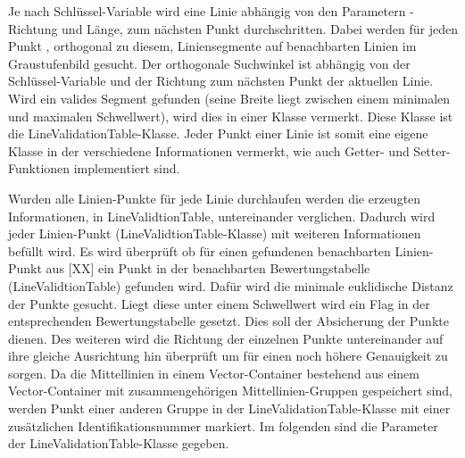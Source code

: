 Je nach Schl{\"u}ssel-Variable wird eine Linie abh{\"a}ngig von den Parametern - Richtung und L{\"a}nge, zum n{\"a}chsten Punkt durchschritten. Dabei werden f{\"u}r jeden Punkt , orthogonal zu diesem, Liniensegmente auf benachbarten Linien im Graustufenbild gesucht. Der orthogonale Suchwinkel ist abh{\"a}ngig von der Schl{\"u}ssel-Variable und der Richtung zum n{\"a}chsten Punkt der aktuellen Linie. Wird ein valides Segment gefunden (seine Breite liegt zwischen einem minimalen und maximalen Schwellwert), wird dies in einer Klasse vermerkt. Diese Klasse ist die LineValidationTable-Klasse. Jeder Punkt einer Linie ist somit eine eigene Klasse in der verschiedene Informationen vermerkt, wie auch Getter- und Setter-Funktionen implementiert sind.


Wurden alle Linien-Punkte f{\"u}r jede Linie durchlaufen werden die erzeugten Informationen, in LineValidtionTable, untereinander verglichen. Dadurch wird jeder Linien-Punkt (LineValidtionTable-Klasse) mit weiteren Informationen bef{\"u}llt wird.
Es wird {\"u}berpr{\"u}ft ob f{\"u}r einen gefundenen benachbarten Linien-Punkt aus [XX] ein Punkt in der benachbarten Bewertungstabelle (LineValidtionTable) gefunden wird. Daf{\"u}r wird die minimale euklidische Distanz der Punkte gesucht. Liegt diese unter einem Schwellwert wird ein Flag in der entsprechenden Bewertungstabelle gesetzt. Dies soll der Absicherung der Punkte dienen. Des weiteren wird die Richtung der einzelnen Punkte untereinander auf ihre gleiche Ausrichtung hin {\"u}berpr{\"u}ft um f{\"u}r einen noch h{\"o}here Genauigkeit zu sorgen.
Da die Mittellinien in einem Vector-Container bestehend aus einem Vector-Container mit zusammengeh{\"o}rigen Mittellinien-Gruppen gespeichert sind, werden Punkt einer anderen Gruppe in der LineValidationTable-Klasse mit einer zus{\"a}tzlichen Identifikationsnummer markiert.
Im folgenden sind die Parameter der LineValidationTable-Klasse gegeben. 












